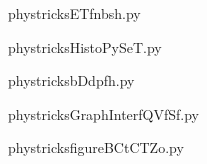     

    \clearpage
    


    \newcommand{\CaptionFigETfnbsh}{<+Type your caption here+>}
    \begin{center}
        
    \end{center}
    phystricksETfnbsh.py

    

    \clearpage
    


    \newcommand{\CaptionFigHistoPySeT}{<+Type your caption here+>}
    \begin{center}
        
    \end{center}
    phystricksHistoPySeT.py

    

    \clearpage
    


    \newcommand{\CaptionFigbDdpfh}{<+Type your caption here+>}
    \begin{center}
        
    \end{center}
    phystricksbDdpfh.py

    

    \clearpage
    


    \newcommand{\CaptionFigGraphInterfQVfSf}{<+Type your caption here+>}
    \begin{center}
        
    \end{center}
    phystricksGraphInterfQVfSf.py

    

    \clearpage
    


    \newcommand{\CaptionFigfigureBCtCTZo}{<+Type your caption here+>}
    \begin{center}
        
    \end{center}
    phystricksfigureBCtCTZo.py

    

    \clearpage
    


